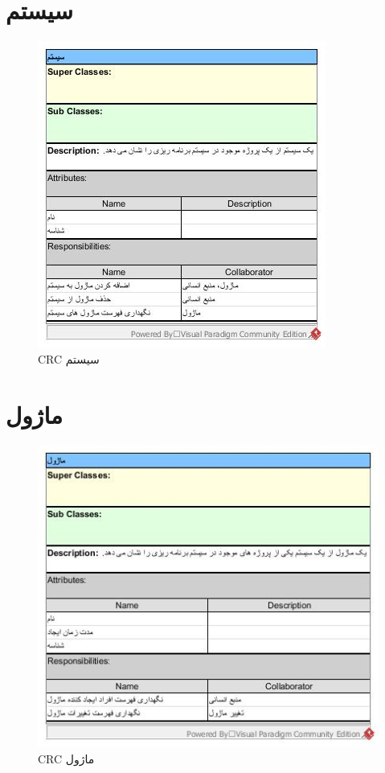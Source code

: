 \section{سیستم}
\begin{figure}[H]
	\centering
	\includegraphics[scale=1]{img/crc/System}
	\caption{CRC سیستم }
\end{figure}


\section{ماژول}
\begin{figure}[H]
	\centering
	\includegraphics[scale=1]{img/crc/Module}
	\caption{CRC ماژول }
\end{figure}

